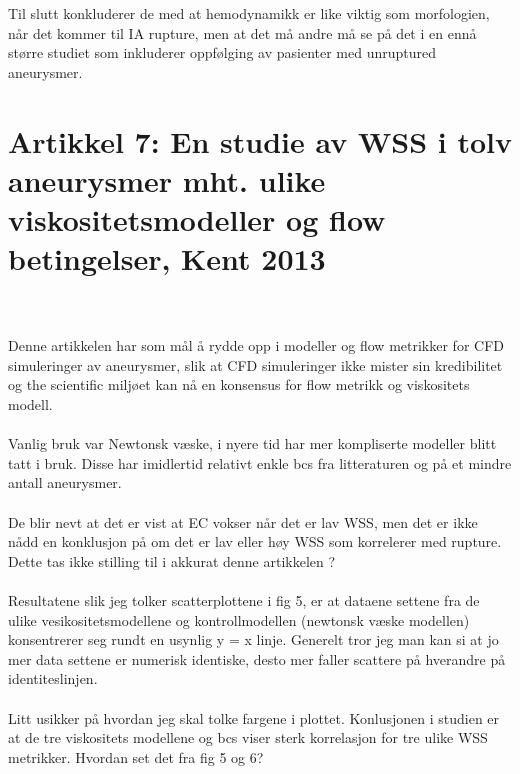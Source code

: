 \documentclass{article}
\begin{document}
Til slutt konkluderer de med at hemodynamikk er like viktig som morfologien, når det kommer til IA rupture, men at det må andre må se på det i en ennå større studiet som inkluderer oppfølging av pasienter med unruptured aneurysmer. 

\section{Artikkel 7: En studie av WSS i tolv aneurysmer mht. ulike viskositetsmodeller og flow betingelser, Kent 2013 }
\\
\\Denne artikkelen har som mål å rydde opp i modeller og flow metrikker for CFD simuleringer av aneurysmer, slik at CFD simuleringer ikke mister sin kredibilitet og the scientific miljøet kan nå en konsensus for flow metrikk og viskositets modell. 
\\
\\Vanlig bruk var Newtonsk væske, i nyere tid har mer kompliserte modeller blitt tatt i bruk. Disse har imidlertid relativt enkle bcs fra litteraturen og på et mindre antall aneurysmer. 
\\
\\De blir nevt at det er vist at EC vokser når det er lav WSS, men det er ikke nådd en konklusjon på om det er lav eller høy WSS som korrelerer med rupture. 
Dette tas ikke stilling til i akkurat denne artikkelen ? 
\\
\\Resultatene slik jeg tolker scatterplottene i fig 5, er at dataene settene fra de ulike vesikositetsmodellene og kontrollmodellen (newtonsk væske modellen) konsentrerer seg rundt en usynlig y = x linje. Generelt tror jeg man kan si at jo mer data settene er numerisk identiske, desto mer faller scattere på hverandre på identiteslinjen. 
\\
\\Litt usikker på hvordan jeg skal tolke fargene i plottet. 
Konlusjonen i studien er at de tre viskositets modellene og bcs viser sterk korrelasjon for tre ulike WSS metrikker. 
Hvordan set det fra fig 5 og 6? 
\end{document}

